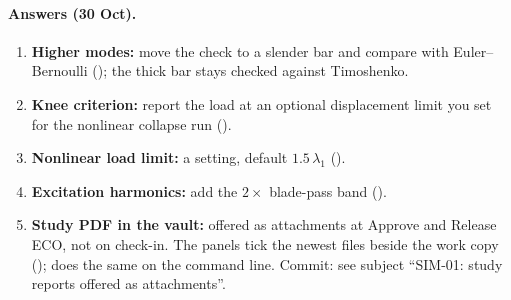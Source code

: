 \paragraph{Answers (30 Oct).}
\begin{enumerate}[nosep]
  \item \textbf{Higher modes:} move the check to a slender bar and compare with Euler--Bernoulli
        (); the thick bar stays checked against Timoshenko.
  \item \textbf{Knee criterion:} report the load at an optional displacement limit you set for the nonlinear
        collapse run ().
  \item \textbf{Nonlinear load limit:} a setting, default $1.5\,\lambda_1$ ().
  \item \textbf{Excitation harmonics:} add the $2\times$ blade-pass band ().
  \item \textbf{Study PDF in the vault:} offered as attachments at Approve and Release ECO, not on check-in.
        The panels tick the newest  files beside the work copy
        ();  does the same on the command line.
        Commit: see  subject ``SIM-01: study reports offered as attachments''.
\end{enumerate}
